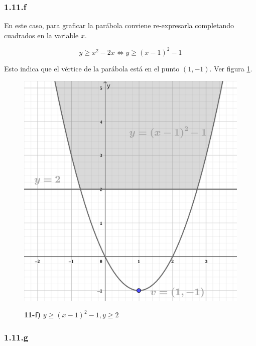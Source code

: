 \documentclass{article}
\begin{document}
\subsubsection*{1.11.f}
\label{subsubsec:1.11.f}

En este caso, para graficar la parábola conviene re-expresarla completando cuadrados en la variable $x$.

\begin{equation}
y \geq x^2 - 2x \Leftrightarrow y \geq (x-1)^2 - 1
\end{equation}

Esto indica que el vértice de la parábola está en el punto $(1, -1)$. Ver figura \ref{fig:1-11-f}.

\begin{figure}[ht]
\caption{\textbf{11-f)} $y \geq (x-1)^2 - 1, y \geq 2$}
\includegraphics[scale=0.75]{img/ejercicios/1/11-f.png} 
\centering
\label{fig:1-11-f}
\end{figure}

\subsubsection*{1.11.g}
\label{subsubsec:1.11.g}
\end{document}
